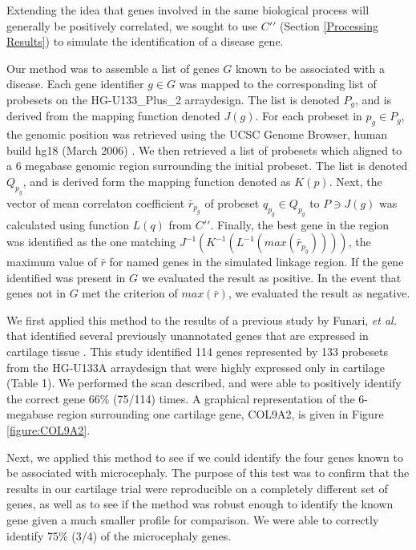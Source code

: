 \documentclass{bioinfo}
\begin{document}
Extending the idea that genes involved in the same biological process will
generally be positively correlated, we sought to use $C\prime\prime$ (Section
\ref{Processing Results}) to simulate the identification of a disease gene.

Our method was to assemble a list of genes $G$ known to be associated with a
disease.  Each gene identifier $g \in G$ was mapped to the corresponding list
of probesets on the HG-U133\_Plus\_2 arraydesign.  The list is denoted $P_g$,
and is derived from the mapping function denoted $J(g)$.  For each probeset in
$p_g \in P_g$, the genomic position was retrieved using the UCSC Genome
Browser, human build hg18 (March 2006) \cite{karolchik}.  We then retrieved a
list of probesets which aligned to a 6 megabase genomic region surrounding the
initial probeset.  The list is denoted $Q_{p_g}$, and is derived form the
mapping function denoted as $K(p)$.  Next, the vector of mean correlaton
coefficient $\bar{r}_{p_g}$ of probeset $q_{p_g} \in Q_{p_g}$ to $P \ni J(g)$
was calculated using function $L(q)$ from $C\prime\prime$.  Finally, the best
gene in the region was identified as the one matching
$J^{-1}(K^{-1}(L^{-1}(max(\bar{r}_{p_g}))))$, the maximum value of $\bar{r}$
for named genes in the simulated linkage region.  If the gene identified was
present in $G$ we evaluated the result as positive.  In the event that genes
not in $G$ met the criterion of $max(\bar{r})$, we evaluated the result as
negative.

We first applied this method to the results of a previous study by Funari,
\emph{et al.} that identified several previously unannotated genes that are
expressed in cartilage tissue \cite{funari}.  This study identified 114 genes
represented by 133 probesets from the HG-U133A arraydesign that were highly
expressed only in cartilage (Table 1).  We performed the scan described, and
were able to positively identify the correct gene 66\% (75/114) times.  A
graphical representation of the 6-megabase region surrounding one cartilage
gene, COL9A2, is given in Figure \ref{figure:COL9A2}.

Next, we applied this method to see if we could identify the four genes known to
be associated with microcephaly.  The purpose of this test was to confirm that
the results in our cartilage trial were reproducible on a completely different
set of genes, as well as to see if the method was robust enough to identify the
known gene given a much smaller profile for comparison.  We were able to
correctly identify 75\% (3/4) of the microcephaly genes.
\end{document}
